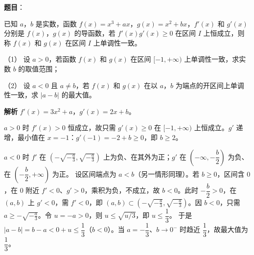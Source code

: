 \begin{answer}

\textbf{题目}：

已知 $a$，$b$ 是实数，函数 $f(x)=x^3+ax$，$g(x)=x^2+bx$，$f'(x)$ 和 $g'(x)$ 分别是 $f(x)$，$g(x)$ 的导函数，若 $f'(x)g'(x)\geqslant0$ 在区间 $I$ 上恒成立，则称 $f(x)$ 和 $g(x)$ 在区间 $I$ 上单调性一致。

（1） 设 $a>0$，若函数 $f(x)$ 和 $g(x)$ 在区间 $[-1,+\infty)$ 上单调性一致，求实数 $b$ 的取值范围；

（2） 设 $a<0$ 且 $a\neq b$，若 $f(x)$ 和 $g(x)$ 在以 $a$，$b$ 为端点的开区间上单调性一致，求 $|a-b|$ 的最大值。

\textbf{解析}
$f'(x)=3x^2+a$，$g'(x)=2x+b$。

$a>0$ 时 $f'(x)>0$ 恒成立，故只需 $g'(x)\geqslant0$ 在 $[-1,+\infty)$ 上恒成立。$g'$ 递增，最小值在 $x=-1$：$g'(-1)=-2+b\geqslant0$，即 $b\geqslant2$。

$a<0$ 时 $f'$ 在 $\left(-\sqrt{-\frac a3},\sqrt{-\frac a3}\right)$ 上为负、在其外为正；$g'$ 在 $\left(-\infty,-\dfrac b2\right)$ 为负、在 $\left(-\dfrac b2,+\infty\right)$ 为正。
设区间端点为 $a<b$（另一情形同理）。若 $b\geqslant0$，区间含 $0$，在 $0$ 附近 $f'<0$、$g'>0$，乘积为负，不成立，故 $b<0$。此时 $-\dfrac b2>0$，在 $(a,b)$ 上 $g'<0$，需 $f'<0$，即 $(a,b)\subset\left(-\sqrt{-\frac a3},\sqrt{-\frac a3}\right)$。因 $b<0$，只需 $a\geqslant-\sqrt{-\frac a3}$。令 $u=-a>0$，则 $u\leqslant\sqrt{u/3}$，即 $u\leqslant\dfrac13$。
于是 $|a-b|=b-a<0+u\leqslant\dfrac13$（$b<0$）。当 $a=-\dfrac13$、$b\to0^-$ 时趋近 $\dfrac13$，故最大值为 $\dfrac13$。



\end{answer}
